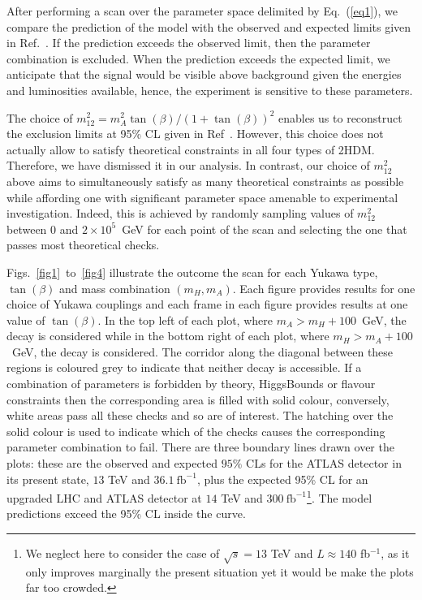 After performing a scan over the parameter space delimited by Eq.~(\ref{eq1}), we compare the prediction of the model with the observed and expected limits given in Ref.~\cite{Aaboud2018AZHbbll}.
If the prediction exceeds the observed limit, then the parameter combination is excluded.
When the prediction exceeds the expected limit, we anticipate that the signal would be visible above background given the energies and luminosities available, hence,  {the experiment is sensitive to these parameters.} %



The choice of \(m^2_{12} = m_A^2 \tan(\beta) / (1 + \tan(\beta))^2\) enables us to reconstruct the exclusion limits at 95\%  CL given in Ref~\cite{Aaboud2018AZHbbll}.
However, this choice does not actually allow to satisfy theoretical constraints in all four types of 2HDM.
Therefore, we have dismissed it in our analysis.
In contrast, our choice of \(m_{12}^2\) above aims to simultaneously satisfy as many theoretical constraints as possible while affording one with significant parameter space amenable to experimental investigation.
Indeed, this is achieved by randomly sampling values of \(m^2_{12}\) between \(0\) and \(2\times 10^{5}\)~GeV for each point of the scan and selecting the one that passes most theoretical checks.



Figs.~\ref{fig1}~to~\ref{fig4} illustrate the outcome the scan for each
Yukawa type, \(\tan(\beta)\) and mass combination $(m_H,m_A)$.
Each figure provides results for one choice of Yukawa couplings
and each frame in each figure provides results at one value of \(\tan(\beta)\).
In the top left of each plot, where \(m_A > m_H+100\)~GeV, the decay \AZH{} is considered while 
in the bottom right of each plot, where \(m_H > m_A+100\)~GeV,   the decay \HZA{} is considered.
The corridor along the diagonal between these regions is coloured grey to indicate that neither decay is accessible.
%
If a combination of parameters is forbidden by theory, HiggsBounds or flavour constraints
then the corresponding area is filled with solid colour, conversely,
white areas pass all these checks and so are of interest. The hatching over the solid colour is used to indicate which of the checks
causes the corresponding parameter combination to fail.
There are three boundary lines drawn over the plots: 
these are the observed and expected \(95\%\) CLs for the ATLAS detector in its present state, \(13\) TeV and \(36.1~\text{fb}^{-1}\),
plus the expected 95\% CL for an upgraded LHC and ATLAS detector at \(14\) TeV and \(300~\text{fb}^{-1}\)\footnote{We neglect here to consider the case of $\sqrt s=13$ TeV and $L\approx140$ fb$^{-1}$, as it only improves marginally the present situation yet it would be make the plots far too crowded.}.
The model predictions exceed the 95\% CL inside the curve.

